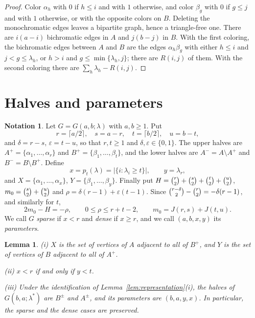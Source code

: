 \documentclass{amsart}
\newtheorem{lemma}[theorem]{Lemma}
\theoremstyle{definition}
\newtheorem{notation}[theorem]{Notation}
\numberwithin{equation}{section}
\numberwithin{table}{section}
\newcommand{\binomtwo}[1]{\tbinom{#1}{2}}
\begin{document}
\begin{proof}
Color $\alpha_h$ with $0$ if $h\le i$ and with $1$ otherwise, and color $\beta_g$ with $0$ if $g\le j$ and with $1$ otherwise, or with the opposite colors on $B$. Deleting the monochromatic edges leaves a bipartite graph, hence a triangle-free one. There are $i(a-i)$ bichromatic edges in $A$ and $j(b-j)$ in $B$. With the first coloring, the bichromatic edges between $A$ and $B$ are the edges $\alpha_h\beta_g$ with either $h\le i$ and $j<g\le\lambda_h$, or $h>i$ and $g\le\min\{\lambda_h,j\}$; there are $R(i,j)$ of them. With the second coloring there are $\sum_h\lambda_h-R(i,j)$.
\end{proof}

\section{Halves and parameters}\label{sec:halves}

\begin{notation}\label{not:halves}
Let $G=G(a,b;\lambda)$ with $a,b\ge 1$. Put
\[
r=\lceil a/2\rceil,\quad s=a-r,\quad t=\lceil b/2\rceil,\quad u=b-t,
\]
and $\delta=r-s$, $\varepsilon=t-u$,
so that $r,t\ge 1$ and $\delta,\varepsilon\in\{0,1\}$. The upper halves are $A^+=\{\alpha_1,\dots,\alpha_r\}$ and $B^+=\{\beta_1,\dots,\beta_t\}$, and the lower halves are $A^-=A\setminus A^+$ and $B^-=B\setminus B^+$. Define
\[
x=p_t(\lambda)=|\{i:\lambda_i\ge t\}|,\qquad y=\lambda_r,
\]
and $X=\{\alpha_1,\dots,\alpha_x\}$, $Y=\{\beta_1,\dots,\beta_y\}$.
Finally put $H=\binomtwo r+\binomtwo s+\binomtwo t+\binomtwo u$, $m_0=\binomtwo s+\binomtwo u$ and $\rho=\delta(r-1)+\varepsilon(t-1)$. Since $\binomtwo{r-\delta}-\binomtwo r=-\delta(r-1)$, and similarly for $t$,
\begin{equation}\label{eq:m0}
2m_0-H=-\rho,\qquad 0\le\rho\le r+t-2,\qquad m_0=J(r,s)+J(t,u).
\end{equation}
We call $G$ \emph{sparse} if $x<r$ and \emph{dense} if $x\ge r$, and we call $(a,b,x,y)$ its \emph{parameters}.
\end{notation}

\begin{lemma}\label{lem:halves}
\textup{(i)} $X$ is the set of vertices of $A$ adjacent to all of $B^+$, and $Y$ is the set of vertices of $B$ adjacent to all of $A^+$.

\textup{(ii)} $x<r$ if and only if $y<t$.

\textup{(iii)} Under the identification of Lemma~\ref{lem:representation}(i), the halves of $G(b,a;\lambda^*)$ are $B^\pm$ and $A^\pm$, and its parameters are $(b,a,y,x)$. In particular, the sparse and the dense cases are preserved.
\end{lemma}
\end{document}
